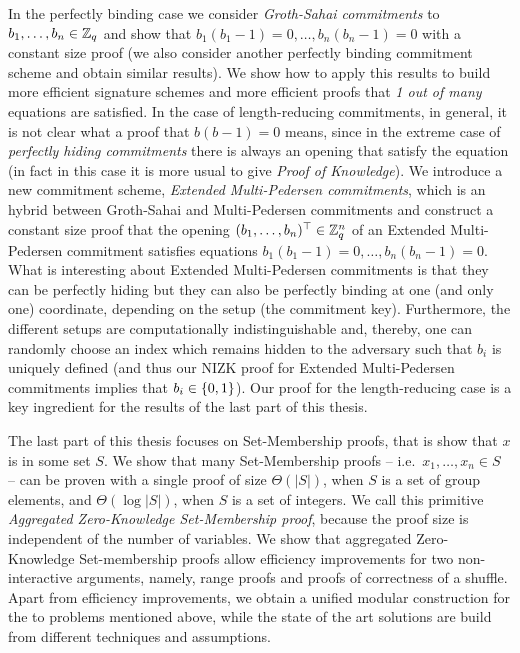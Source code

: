 In the perfectly binding case we consider \emph{Groth-Sahai commitments} to $b_1,\ldots,\allowbreak b_n\allowbreak\in\mathbb{Z}_q$ and show that $b_1(b_1-1)=0,\ldots,b_n(b_n-1)=0$ with a constant size proof (we also consider another perfectly binding commitment scheme and obtain similar results). We show how to apply this results to build more efficient signature schemes and more efficient proofs that \emph{1 out of many} equations are satisfied. In the case of length-reducing commitments, in general, it is not clear what a proof that $b(b-1)=0$ means, since in the extreme case of \emph{perfectly hiding commitments} there is always an opening that satisfy the equation (in fact in this case it is more usual to give \emph{Proof of Knowledge}). We introduce a new commitment scheme, \emph{Extended Multi-Pedersen commitments}, which is an hybrid between Groth-Sahai and Multi-Pedersen commitments and construct a constant size proof that the opening $(b_1,\ldots,b_n)^\top\in\mathbb{Z}_q^n$ of an Extended Multi-Pedersen commitment satisfies equations $b_1(b_1-1)=0,\ldots,b_n(b_n-1)=0$. What is interesting about Extended Multi-Pedersen commitments is that they can be perfectly hiding but they can also be perfectly binding at one (and only one) coordinate, depending on the setup (the commitment key). Furthermore, the different setups are computationally indistinguishable and, thereby, one can randomly choose an index which remains hidden to the adversary such that $b_i$ is uniquely defined (and thus our NIZK proof for Extended Multi-Pedersen commitments implies that $b_i\in\{0,1\}$). Our proof for the length-reducing case is a key ingredient for the results of the last part of this thesis.
 
The last part of this thesis focuses on Set-Membership proofs, that is show that $x$ is in some set $S$. We show that many Set-Membership proofs -- i.e.~$x_1,\ldots,x_n\in S$ -- can be proven with a single proof of size $\Theta(|S|)$, when $S$ is a set of group elements, and $\Theta(\log |S|)$, when $S$ is a set of integers. We call this primitive \emph{Aggregated Zero-Knowledge Set-Membership proof}, because the proof size is independent of the number of variables. We show that aggregated Zero-Knowledge Set-membership proofs allow efficiency improvements for two non-interactive arguments, namely, range proofs and proofs of correctness of a shuffle. Apart from efficiency improvements, we obtain a unified modular construction for the to problems mentioned above, while the state of the art solutions are build from different techniques and assumptions.
